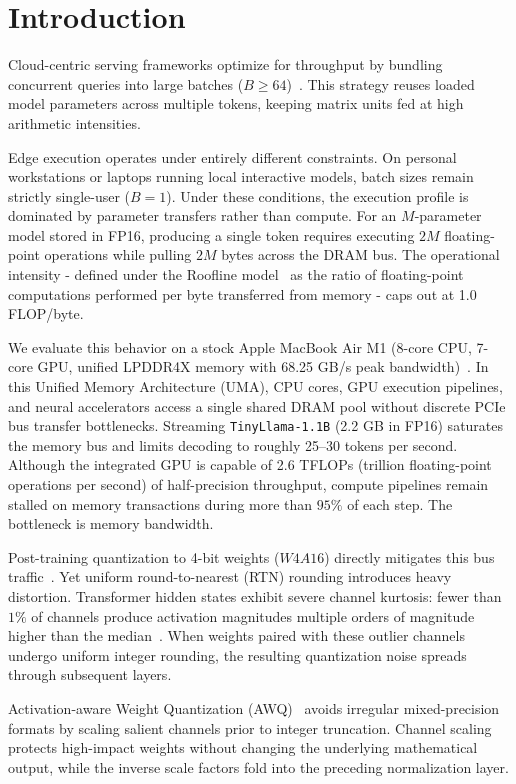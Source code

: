 \documentclass[runningheads,oribibl]{llncs}
\begin{document}
\section{Introduction}
Cloud-centric serving frameworks optimize for throughput by bundling concurrent queries into large batches ($B \ge 64$)~\cite{sheng2023flexgen}. This strategy reuses loaded model parameters across multiple tokens, keeping matrix units fed at high arithmetic intensities.

Edge execution operates under entirely different constraints. On personal workstations or laptops running local interactive models, batch sizes remain strictly single-user ($B=1$). Under these conditions, the execution profile is dominated by parameter transfers rather than compute. For an $M$-parameter model stored in FP16, producing a single token requires executing $2M$ floating-point operations while pulling $2M$ bytes across the DRAM bus. The operational intensity - defined under the Roofline model~\cite{williams2009roofline} as the ratio of floating-point computations performed per byte transferred from memory - caps out at 1.0 FLOP/byte.

We evaluate this behavior on a stock Apple MacBook Air M1 (8-core CPU, 7-core GPU, unified LPDDR4X memory with 68.25 GB/s peak bandwidth)~\cite{apple2020m1}. In this Unified Memory Architecture (UMA), CPU cores, GPU execution pipelines, and neural accelerators access a single shared DRAM pool without discrete PCIe bus transfer bottlenecks. Streaming \texttt{TinyLlama-1.1B} (2.2 GB in FP16) saturates the memory bus and limits decoding to roughly 25--30 tokens per second. Although the integrated GPU is capable of 2.6 TFLOPs (trillion floating-point operations per second) of half-precision throughput, compute pipelines remain stalled on memory transactions during more than $95\%$ of each step. The bottleneck is memory bandwidth.

Post-training quantization to 4-bit weights ($W4A16$) directly mitigates this bus traffic~\cite{frantar2022gptq,dettmers2023qlora}. Yet uniform round-to-nearest (RTN) rounding introduces heavy distortion. Transformer hidden states exhibit severe channel kurtosis: fewer than $1\%$ of channels produce activation magnitudes multiple orders of magnitude higher than the median~\cite{dettmers2022llmint8,xiao2023smoothquant}. When weights paired with these outlier channels undergo uniform integer rounding, the resulting quantization noise spreads through subsequent layers.

Activation-aware Weight Quantization (AWQ)~\cite{lin2024awq} avoids irregular mixed-precision formats by scaling salient channels prior to integer truncation. Channel scaling protects high-impact weights without changing the underlying mathematical output, while the inverse scale factors fold into the preceding normalization layer.
\end{document}
